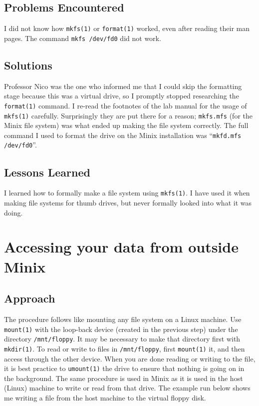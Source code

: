 \documentclass[11pt]{article}
\begin{document}
\subsection{Problems Encountered}
I did not know how {\tt mkfs(1)} or {\tt format(1)} worked, even after reading their man pages. The command {\tt mkfs /dev/fd0} did not work.

\subsection{Solutions}
Professor Nico was the one who informed me that I could skip the formatting stage because this was a virtual drive, so I promptly stopped researching the {\tt format(1)} command. I re-read the footnotes of the lab manual for the usage of {\tt mkfs(1)} carefully. Surprisingly they are put there for a reason; {\tt mkfs.mfs} (for the {\sc Minix} file system) was what ended up making the file system correctly. The full command I used to format the drive on the {\sc Minix} installation was ``{\tt mkfd.mfs /dev/fd0}''.

\subsection{Lessons Learned}
I learned how to formally make a file system using {\tt mkfs(1)}. I have used it when making file systems for thumb drives, but never formally looked into what it was doing.

\section{Accessing your data from outside {\sc Minix}}
\subsection{Approach}
The procedure follows like mounting any file system on a Linux machine. Use {\tt mount(1)} with the loop-back device (created in the previous step) under the directory {\tt /mnt/floppy}. It may be necessary to make that directory first with {\tt mkdir(1)}. To read or write to files in {\tt /mnt/floppy}, first {\tt mount(1)} it, and then access through the other device. When you are done reading or writing to the file, it is best practice to {\tt umount(1)} the drive to ensure that nothing is going on in the background. The same procedure is used in {\sc Minix} as it is used in the host (Linux) machine to write or read from that drive. The example run below shows me writing a file from the host machine to the virtual floppy disk.
\end{document}
